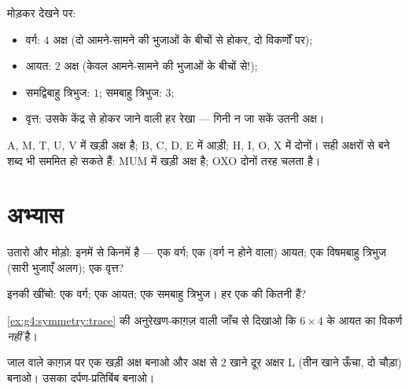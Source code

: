 \begin{example}[अक्ष गिनना]\label{ex:g4:symmetry:shapes}
मोड़कर देखने पर:
\begin{itemize}
  \item वर्ग: $4$ अक्ष (दो आमने-सामने की भुजाओं के बीचों से
        होकर, दो विकर्णों पर);
  \item आयत: $2$ अक्ष (केवल आमने-सामने की भुजाओं के बीचों से!);
  \item समद्विबाहु त्रिभुज: $1$; समबाहु त्रिभुज: $3$;
  \item वृत्त: उसके केंद्र से होकर जाने वाली हर रेखा --- गिनी न
        जा सकें उतनी अक्ष।
\end{itemize}
\end{example}

\begin{example}[वर्णमाला में सममिति]\label{ex:g4:symmetry:letters}
A, M, T, U, V में खड़ी अक्ष है; B, C, D, E में आड़ी;
H, I, O, X में दोनों। सही अक्षरों से बने शब्द भी सममित हो सकते
हैं: MUM में खड़ी अक्ष है; OXO दोनों तरह चलता है।
\end{example}

\section{अभ्यास}

\begin{exercise}[$\star$]\label{exo:g4:symmetry:1}
उतारो और मोड़ो: इनमें से किनमें  है --- एक वर्ग;
एक (वर्ग न होने वाला) आयत; एक विषमबाहु त्रिभुज (सारी भुजाएँ
अलग); एक वृत्त?
\end{exercise}

\begin{exercise}[$\star$]\label{exo:g4:symmetry:2}
इनकी  खींचो: एक वर्ग; एक आयत; एक समबाहु त्रिभुज।
हर एक की कितनी हैं?
\end{exercise}

\begin{exercise}[$\star$]\label{exo:g4:symmetry:3}
\cref{ex:g4:symmetry:trace} की अनुरेखण-काग़ज़ वाली जाँच से दिखाओ
कि $6 \times 4$ के आयत का विकर्ण  \emph{नहीं}
है।
\end{exercise}

\begin{exercise}[$\star$]\label{exo:g4:symmetry:4}
जाल वाले काग़ज़ पर एक खड़ी अक्ष बनाओ और अक्ष से $2$ खाने दूर
अक्षर L (तीन खाने ऊँचा, दो चौड़ा) बनाओ। उसका दर्पण-प्रतिबिंब
बनाओ।
\end{exercise}

